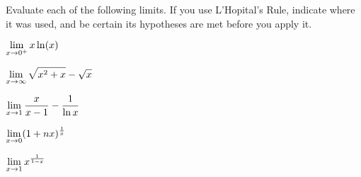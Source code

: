 \begin{activity} \label{A:3.7.4}  
Evaluate each of the following limits.  If you use L'Hopital's Rule, indicate where it was used, and be certain its hypotheses are met before you apply it.
\ba
\item $\displaystyle \lim_{x \to 0^+} x\ln(x)$
\item $\displaystyle \lim_{x \to \infty} \sqrt{x^2+x}- \sqrt{x}$
\item $\displaystyle \lim_{x \to 1} \frac{x}{x-1}- \frac{1}{\ln x}$
\item $\displaystyle \lim_{x \to 0} (1+nx)^{\frac1x}$ 
\item $\displaystyle \lim_{x \to 1} x^{\frac{1}{1-x}}$ 
\ea
\end{activity}
